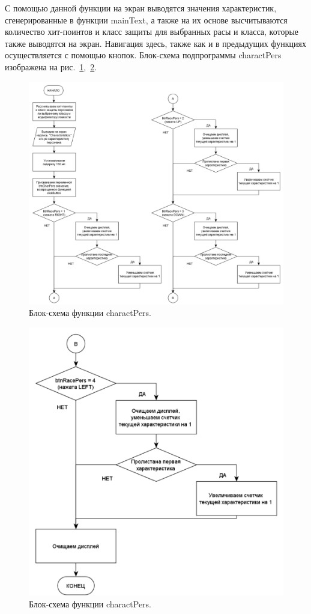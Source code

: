 С помощью данной функции на экран выводятся значения характеристик, сгенерированные в функции mainText, а также на их основе высчитываются количество хит-поинтов и класс защиты для выбранных расы и класса, которые также выводятся на экран. Навигация здесь, также как и в предыдущих функциях осуществляется с помощью кнопок. Блок-схема подпрограммы charactPers изображена на рис.~\ref{fig:char1},~\ref{fig:char2}.

\begin{figure}[H]
    \centering
    \includegraphics[scale=0.75]{charactPers1.png}
    \caption{Блок-схема функции charactPers.}
    \label{fig:char1}
\end{figure}

\begin{figure}[H]
    \centering
    \includegraphics[scale=0.6]{charactPers2.png}
    \caption{Блок-схема функции charactPers.}
    \label{fig:char2}
\end{figure}

